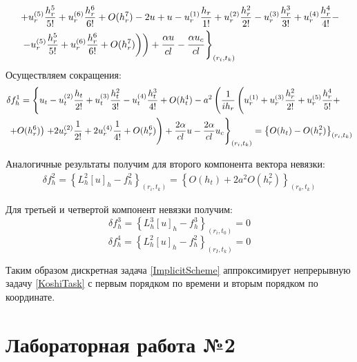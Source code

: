 \documentclass[a4paper,12pt,russian, fleqn]{extreport}
\begin{document}
 	\begin{align}
	 	& \left. + u^{(5)}_r\dfrac{h^5_r}{5!} + u^{(6)}_r\dfrac{h^6_r}{6!} + O(h_r^7) - 2u + u - u^{(1)}_r\dfrac{h_r}{1!} + u^{(2)}_r\dfrac{h^2_r}{2!} - u^{(3)}_r\dfrac{h^3_r}{3!} + u^{(4)}_r\dfrac{h^4_r}{4!} - \right. \nonumber \\
	 	& \left. \left. \left. - u^{(5)}_r\dfrac{h^5_r}{5!} + u^{(6)}_r\dfrac{h^6_r}{6!} + O(h_r^7)  \right) \right) + \dfrac{\strut \alpha u}{\strut cl} - \dfrac{\strut \alpha u_c}{cl}\right\}_{(r_i, t_k)} \nonumber
 	\end{align}
 	Осуществляем сокращения:
 	\begin{align}
 		& \delta f_h^1 = \left\{ u_t - u_t^{(2)}\dfrac{\strut h_t}{\strut 2!} +  u_t^{(3)}\dfrac{\strut h_t^2}{\strut 3!} -  u_t^{(4)}\dfrac{\strut h_t^3}{\strut 4!} + O(h_t^4) - a^2 \left( \dfrac{1}{ih_r}\left(u_r^{(1)} + u_r^{(3)}\dfrac{\strut h_r^2}{\strut 2!} + u_r^{(5)}\dfrac{\strut h_r^4}{\strut 5!} + \right. \right. \right. \nonumber  \\ 
 		& \left. \left. + O(h_r^6) \right) \left. + 2u_r^{(2)}\dfrac{\strut 1}{2!} + 2u_r^{(4)}\dfrac{\strut 1}{\strut 4!} + O(h_r^6) \right) + \dfrac{2\alpha}{cl}u - \dfrac{2\alpha}{cl}u_c \right\}_{(r_i, t_k)}  \nonumber = \left\{ O(h_t) - O(h_r^2) \right\}_{(r_i, t_k)}
 	\end{align}
 	
 	Аналогичные результаты получим для второго компонента вектора невязки:
 	\begin{align}
	 	\delta f^2_h = \left\{ L^2_h[u]_h - f^2_h \right\} _{(r_i, t_k)} = \left\{ O(h_t) + 2a^2O(h_r^2)\right\}_{(r_0, t_k)} \nonumber
 	\end{align}
 	
 	Для третьей и четвертой компонент невязки получим:
 	\begin{equation*}
	 	\delta f^3_h = \left\{ L_h^3[u]_h - f^3_h \right\}_{(r_i, t_0)} = 0
 	\end{equation*}
 	\begin{equation*}
	 	\delta f^4_h = \left\{ L_h^2[u]_h - f^2_h \right\}_{(r_I, t_k)} = 0
 	\end{equation*}
 	
 	Таким образом дискретная задача \eqref{ImplicitScheme} аппроксимирует непрерывную задачу \eqref{KoshiTask} с первым порядком по времени и вторым порядком по координате.
	\chapter{Лабораторная работа №2}
\end{document}
